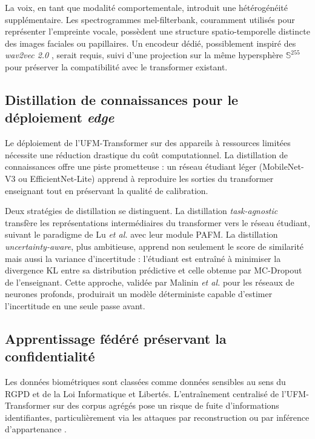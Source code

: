 \documentclass[12pt,a4paper]{report}
\begin{document}
La voix, en tant que modalit\'{e} comportementale, introduit une h\'{e}t\'{e}rog\'{e}n\'{e}it\'{e} suppl\'{e}mentaire. Les spectrogrammes mel-filterbank, couramment utilis\'{e}s pour repr\'{e}senter l'empreinte vocale, poss\`{e}dent une structure spatio-temporelle distincte des images faciales ou papillaires. Un encodeur d\'{e}di\'{e}, possiblement inspir\'{e} des \emph{wav2vec 2.0} \cite{baevski2020wav2vec}, serait requis, suivi d'une projection sur la m\^{e}me hypersph\`{e}re $\mathbb{S}^{255}$ pour pr\'{e}server la compatibilit\'{e} avec le transformer existant.

\subsection{Distillation de connaissances pour le d\'{e}ploiement \emph{edge}}
\label{sec:distillation}

Le d\'{e}ploiement de l'UFM-Transformer sur des appareils \`{a} ressources limit\'{e}es n\'{e}cessite une r\'{e}duction drastique du co\^{u}t computationnel. La distillation de connaissances \cite{hinton2015distilling} offre une piste prometteuse : un r\'{e}seau \'{e}tudiant l\'{e}ger (MobileNet-V3 \cite{howard2019mobilenetv3} ou EfficientNet-Lite) apprend \`{a} reproduire les sorties du transformer enseignant tout en pr\'{e}servant la qualit\'{e} de calibration.

Deux strat\'{e}gies de distillation se distinguent. La distillation \emph{task-agnostic} transf\`{e}re les repr\'{e}sentations interm\'{e}diaires du transformer vers le r\'{e}seau \'{e}tudiant, suivant le paradigme de Lu \emph{et al.} \cite{lu2025mpad} avec leur module PAFM. La distillation \emph{uncertainty-aware}, plus ambitieuse, apprend non seulement le score de similarit\'{e} mais aussi la variance d'incertitude : l'\'{e}tudiant est entra\^{i}n\'{e} \`{a} minimiser la divergence KL entre sa distribution pr\'{e}dictive et celle obtenue par MC-Dropout de l'enseignant. Cette approche, valid\'{e}e par Malinin \emph{et al.} \cite{malinin2019ensemble} pour les r\'{e}seaux de neurones profonds, produirait un mod\`{e}le d\'{e}terministe capable d'estimer l'incertitude en une seule passe avant.

\subsection{Apprentissage f\'{e}d\'{e}r\'{e} pr\'{e}servant la confidentialit\'{e}}

Les donn\'{e}es biom\'{e}triques sont class\'{e}es comme donn\'{e}es sensibles au sens du RGPD et de la Loi Informatique et Libert\'{e}s. L'entra\^{i}nement centralis\'{e} de l'UFM-Transformer sur des corpus agr\'{e}g\'{e}s pose un risque de fuite d'informations identifiantes, particuli\`{e}rement via les attaques par reconstruction \cite{fredrikson2015model} ou par inf\'{e}rence d'appartenance \cite{shokri2017membership}.
\end{document}

